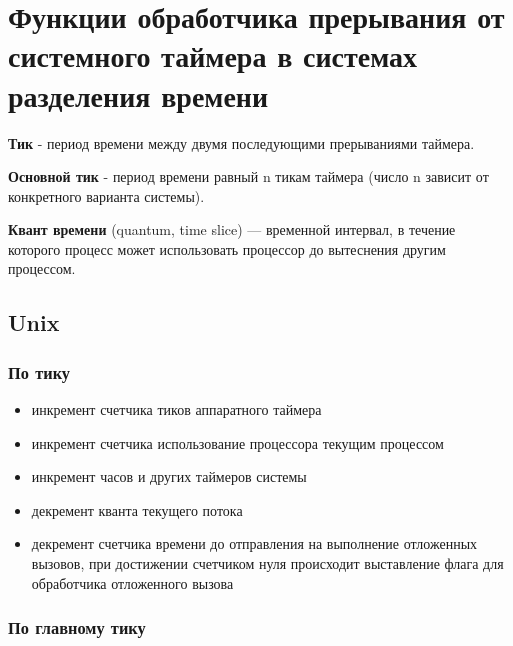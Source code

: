 \setcounter{page}{2}
\chapter{Функции обработчика прерывания от системного таймера в системах разделения времени}


\textbf{Тик} - период времени между двумя последующими прерываниями таймера.

\textbf{Основной тик} - период времени равный n тикам таймера (число n зависит от конкретного варианта системы).

\textbf{Квант времени} (quantum, time slice) — временной интервал, в течение которого процесс может использовать процессор до вытеснения другим процессом.
	

\section{Unix} %
\subsection*{По тику}

\begin{itemize}
	\item инкремент счетчика тиков аппаратного таймера
	\item инкремент счетчика использование процессора текущим процессом %
	\item инкремент часов и других таймеров системы
	\item декремент кванта текущего потока
	\item декремент счетчика времени до отправления на выполнение отложенных вызовов, при достижении счетчиком нуля происходит выставление флага для обработчика отложенного вызова \cite{unix}
\end{itemize}

\subsection*{По главному тику}

